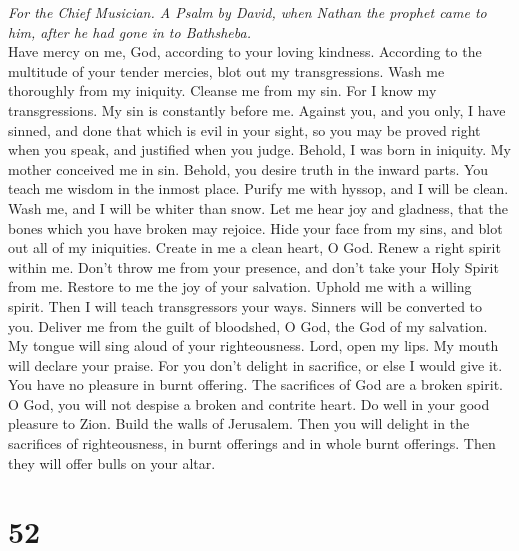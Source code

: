 \emph{For the Chief Musician. A Psalm by David, when Nathan the prophet
came to him, after he had gone in to Bathsheba.}\\
 Have mercy on me, God, according to your loving kindness.
According to the multitude of your tender mercies, blot out my
transgressions.  Wash me thoroughly from my iniquity.
Cleanse me from my sin.  For I know my transgressions. My
sin is constantly before me.  Against you, and you only, I
have sinned, and done that which is evil in your sight, so you may be
proved right when you speak, and justified when you judge.
 Behold, I was born in iniquity. My mother conceived me in
sin.  Behold, you desire truth in the inward parts. You
teach me wisdom in the inmost place.  Purify me with
hyssop, and I will be clean. Wash me, and I will be whiter than snow.
 Let me hear joy and gladness, that the bones which you
have broken may rejoice.  Hide your face from my sins, and
blot out all of my iniquities.  Create in me a clean
heart, O God. Renew a right spirit within me.  Don't
throw me from your presence, and don't take your Holy Spirit from me.
 Restore to me the joy of your salvation. Uphold me with
a willing spirit.  Then I will teach transgressors your
ways. Sinners will be converted to you.  Deliver me from
the guilt of bloodshed, O God, the God of my salvation. My tongue will
sing aloud of your righteousness.  Lord, open my lips. My
mouth will declare your praise.  For you don't delight in
sacrifice, or else I would give it. You have no pleasure in burnt
offering.  The sacrifices of God are a broken spirit. O
God, you will not despise a broken and contrite heart. 
Do well in your good pleasure to Zion. Build the walls of Jerusalem.
 Then you will delight in the sacrifices of
righteousness, in burnt offerings and in whole burnt offerings. Then
they will offer bulls on your altar.

\hypertarget{section-51}{%
\section{52}\label{section-51}}

